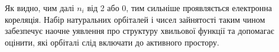 %

Як видно, чим далі $n_i$ від 2 або 0, тим сильніше проявляється електронна кореляція.
Набір натуральних орбіталей і чисел зайнятості таким чином забезпечує
наочне уявлення про структуру хвильової функції
та допомагає оцінити, які орбіталі слід включати до активного простору.

